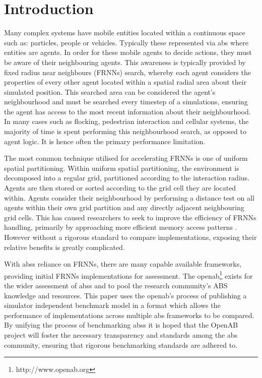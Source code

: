 \section{Introduction}
\vspace{-0.5cm}
Many complex systems have mobile entities located within a continuous space such as: particles, people or vehicles. Typically these represented via \gls{abs} where entities are agents. In order for these mobile agents to decide actions, they must be aware of their neighbouring agents. This awareness is typically provided by fixed radius near neighbours (FRNNs) search, whereby each agent considers the properties of every other agent located within a spatial radial area about their simulated position. This searched area can be considered the agent's neighbourhood and must be searched every timestep of a simulations, ensuring the agent has access to the most recent information about their neighbourhood. In many cases such as flocking, pedestrian interaction and cellular systems, the majority of time is spent performing this neighbourhood search, as opposed to agent logic. It is hence often the primary performance limitation.
  
  The most common technique utilised for accelerating FRNNs is one of uniform spatial partitioning. Within uniform spatial partitioning, the environment is decomposed into a regular grid, partitioned according to the interaction radius. Agents are then stored or sorted according to the grid cell they are located within. Agents consider their neighbourhood by performing a distance test on all agents within their own grid partition and any directly adjacent neighbouring grid cells. This has caused researchers to seek to improve the efficiency of FRNNs handling, primarily by approaching more efficient memory access patterns \cite{GS*10,Hoe14,HY*15}. However without a rigorous standard to compare implementations, exposing their relative benefits is greatly complicated.
  
  With \glspl{abs} reliance on FRNNs, there are many capable available frameworks, providing initial FRNNs implementations for assessment. The \gls{openab}\footnote{http://www.openab.org} exists for the wider assessment of \glspl{abs} and to pool the research community's ABS knowledge and resources. This paper uses the \gls{openab}'s process of publishing a simulator independent benchmark model in a format which allows the performance of implementations across multiple \gls{abs} frameworks to be compared. By unifying the process of benchmarking \glspl{abs} it is hoped that the OpenAB project will foster the necessary transparency and standards among the \gls{abs} community, ensuring that rigorous benchmarking standards are adhered to.
  
